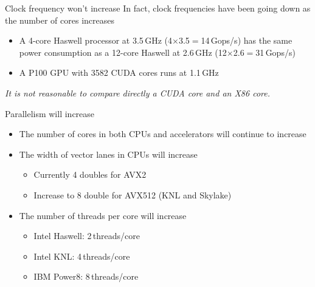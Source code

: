 \documentclass[aspectratio=169,12pt]{beamer}
\begin{document}
\begin{frame}{Clock frequency won't increase}
  In fact, clock frequencies have been going down as the number of cores increases
  \begin{itemize}
  \item A 4-core Haswell processor at 3.5\,GHz (4$\times$3.5$=$14\,Gops/s) has the same power consumption as a 12-core Haswell at 2.6\,GHz (12$\times$2.6$=$31\,Gops/s)
  \item A P100 GPU with 3582 CUDA cores runs at 1.1\,GHz
  \end{itemize}
  \vfill
  \emph{It is not reasonable to compare directly a CUDA core and an X86 core.}
\end{frame}

\begin{frame}{Parallelism will increase}
  \begin{itemize}
  \item The number of cores in both CPUs and accelerators will continue to increase
  \item The width of vector lanes in CPUs will increase
    \begin{itemize}
    \item Currently 4 doubles for AVX2
    \item Increase to 8 double for AVX512 (KNL and Skylake)
    \end{itemize}
  \item The number of threads per core will increase
    \begin{itemize}
    \item Intel Haswell: 2\,threads/core
    \item Intel KNL: 4\,threads/core
    \item IBM Power8: 8\,threads/core
    \end{itemize}
  \end{itemize}
\end{frame}
\end{document}

